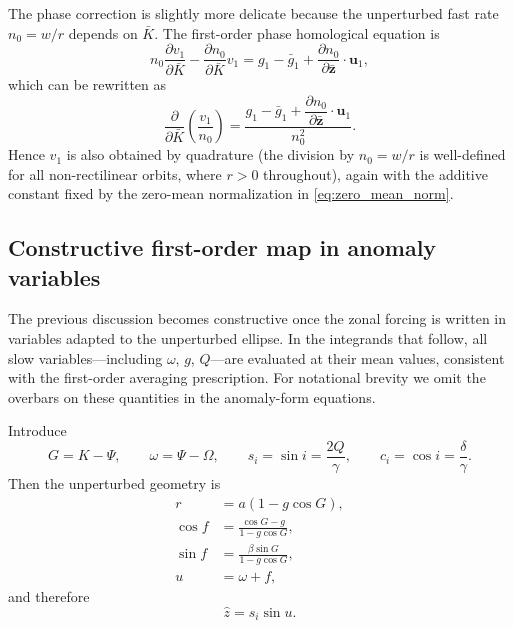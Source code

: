 \documentclass[11pt]{article}
\begin{document}
The phase correction is slightly more delicate because the unperturbed fast rate
$n_0=w/r$ depends on $\bar K$. The first-order phase homological equation is
\begin{equation}
n_0\frac{\partial v_1}{\partial \bar K}
- \frac{\partial n_0}{\partial \bar K}v_1
= g_1 - \bar g_1
+ \frac{\partial n_0}{\partial \bar{\bm z}}\cdot \bm u_1,
\label{eq:homological_v}
\end{equation}
which can be rewritten as
\begin{equation}
\frac{\partial}{\partial \bar K}
\left(
\frac{v_1}{n_0}
\right)
= \frac{
g_1 - \bar g_1
+ \dfrac{\partial n_0}{\partial \bar{\bm z}}\cdot \bm u_1
}{
n_0^2
}.
\label{eq:v_prime}
\end{equation}
Hence $v_1$ is also obtained by quadrature (the division by $n_0 = w/r$ is
well-defined for all non-rectilinear orbits, where $r > 0$ throughout),
again with the additive constant
fixed by the zero-mean normalization in \eqref{eq:zero_mean_norm}.

\subsection{Constructive first-order map in anomaly variables}

The previous discussion becomes constructive once the zonal forcing is written
in variables adapted to the unperturbed ellipse. In the integrands
that follow, all slow variables---including $\omega$, $g$, $Q$---are
evaluated at their mean values, consistent with the first-order averaging
prescription. For notational brevity we omit the overbars on these
quantities in the anomaly-form equations.

Introduce
\begin{equation}
G = K - \Psi,
\qquad
\omega = \Psi - \Omega,
\qquad
s_i = \sin i = \frac{2Q}{\gamma},
\qquad
c_i = \cos i = \frac{\delta}{\gamma}.
\end{equation}
Then the unperturbed geometry is
\begin{align}
r &= a(1-g\cos G), \\
\cos f &= \frac{\cos G - g}{1-g\cos G}, \\
\sin f &= \frac{\beta \sin G}{1-g\cos G}, \\
u &= \omega + f,
\end{align}
and therefore
\begin{equation}
\hat z = s_i \sin u.
\end{equation}
\end{document}

